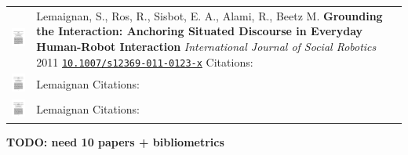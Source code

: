 \documentclass[11pt]{report}
\newcommand{\TODO}[1]{{\color{red}\textbf{TODO: #1}}}
\begin{document}
\begin{tabular}{p{1.8cm}p{6cm}p{7cm}}
    \vspace{0cm}\includegraphics[width=2cm]{thumbs/2019-science.jpg} &

    Lemaignan, S., Ros, R., Sisbot, E. A., Alami, R., Beetz M. \textbf{Grounding
    the Interaction: Anchoring Situated Discourse in Everyday Human-Robot
    Interaction} 
    \newline \textit{International Journal of Social Robotics} 2011
    \newline \texttt{\href{https://doi.org/10.1007/s12369-011-0123-x}{10.1007/s12369-011-0123-x}}
    \newline Citations: 
    & \small \\


    \vspace{0cm}\includegraphics[width=2cm]{thumbs/2019-science.jpg} &
    Lemaignan
    \newline Citations: 
    & \small \\


    \vspace{0cm}\includegraphics[width=2cm]{thumbs/2019-science.jpg} &
    Lemaignan
    \newline Citations: 
    & \small \\




\end{tabular}

\TODO{need 10 papers + bibliometrics}
\end{document}
